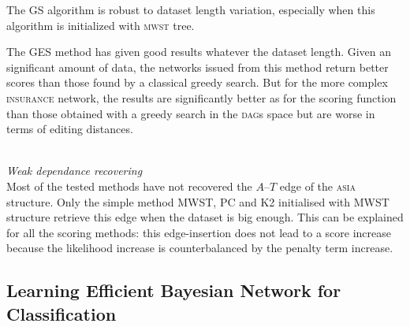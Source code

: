 The GS algorithm is robust to dataset length variation, especially when this algorithm is initialized with \textsc{mwst} tree.

The GES method has given good results whatever the dataset length.
Given an significant amount of data, the networks issued from this method return better scores than those found by a classical greedy search.
But for the more complex \textsc{insurance} network, the results are significantly better as for the scoring function than those obtained with a greedy search in the \textsc{dag}s space but are worse in terms of editing distances.

~\\\textit{Weak dependance recovering}~\\
Most of the tested methods have not recovered the $A$--$T$ edge of the \textsc{asia} structure. Only the simple method MWST, PC and K2 initialised with MWST structure retrieve this edge when the dataset is big enough.
This can be explained for all the scoring methods: this edge-insertion does not lead to a score increase because the likelihood increase is counterbalanced by the penalty term increase.


\subsection{Learning Efficient Bayesian Network for Classification\label{classif}}

